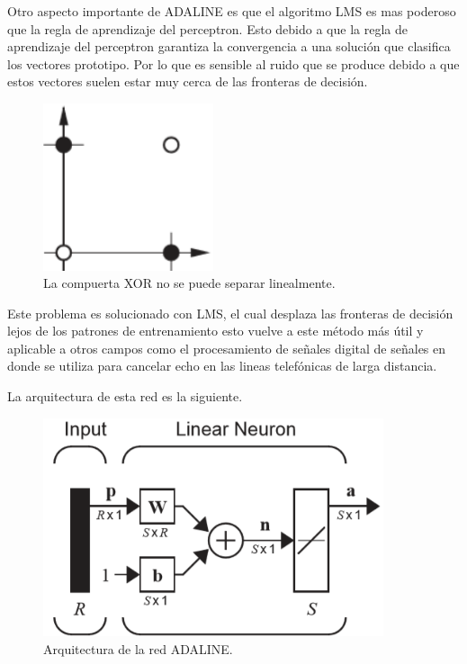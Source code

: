 \documentclass[12pt, titlepage]{article}
\begin{document}
        Otro aspecto importante de ADALINE es que el algoritmo LMS es mas poderoso que la regla de aprendizaje del perceptron. Esto debido a que la regla de aprendizaje del perceptron garantiza la convergencia a una solución que clasifica los vectores prototipo. Por lo que es sensible al ruido que se produce debido a que estos vectores suelen estar muy cerca de las fronteras de decisión.
        \begin{figure}[H]
            \begin{center}
                \includegraphics[width=5cm]{img/adaline/XOR.png}
                \caption{La compuerta XOR no se puede separar linealmente. \cite{libro1}}
                \label{fig:XOR}
            \end{center}
        \end{figure}
        Este problema es solucionado con LMS, el cual desplaza las fronteras de decisión lejos de los patrones de entrenamiento esto vuelve a este método más útil y aplicable a otros campos como el procesamiento de señales digital de señales en donde se utiliza para cancelar echo en las lineas telefónicas de larga distancia.
        
        La arquitectura de esta red es la siguiente.
        
        \begin{figure}[H]
            \begin{center}
                \includegraphics[width=10cm]{img/adaline/arquitectura.png}
                \caption{Arquitectura de la red ADALINE. \cite{libro1}}
                \label{fig:adaline-diagrama}
            \end{center}
        \end{figure}
\end{document}

